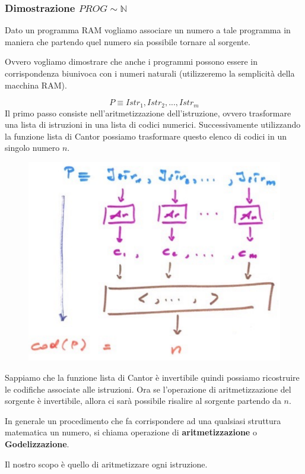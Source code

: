 \documentclass{article}
\begin{document}
\subsubsection{Dimostrazione $PROG\sim\mathbb{N}$}
Dato un programma RAM vogliamo associare un numero a tale programma
in maniera che partendo quel numero sia possibile tornare al sorgente.

Ovvero vogliamo dimostrare che anche i programmi possono essere in corrispondenza biunivoca
con i numeri naturali (utilizzeremo la semplicità della macchina RAM).

$$P\equiv Istr_1,Istr_2,...,Istr_m$$
Il primo passo consiste nell'aritmetizzazione dell'istruzione, ovvero trasformare una lista
di istruzioni in una lista di codici numerici. Successivamente utilizzando la funzione lista
di Cantor possiamo trasformare questo elenco di codici in un singolo numero $n$.
\begin{figure}[H]
    \centering
    \includegraphics[scale=0.5]{images/PROG_to_num.png}
\end{figure}
Sappiamo che la funzione lista di Cantor è invertibile quindi possiamo ricostruire le codifiche
associate alle istruzioni. Ora se l'operazione di aritmetizzazione del sorgente è
invertibile, allora ci sarà possibile risalire al sorgente partendo da $n$.

In generale un procedimento che fa corrispondere ad una qualsiasi struttura matematica
un numero, si chiama operazione di \textbf{aritmetizzazione} o \textbf{Godelizzazione}.

Il nostro scopo è quello di aritmetizzare ogni istruzione.
\end{document}
